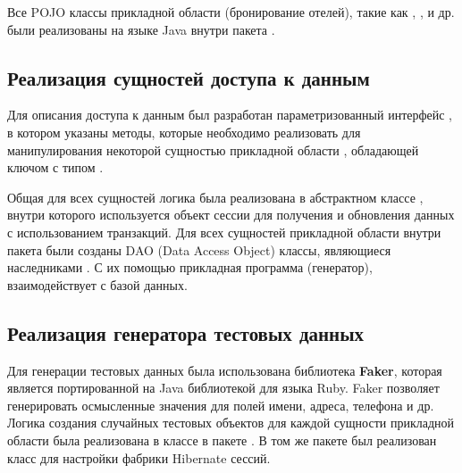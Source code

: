 Все POJO классы прикладной области (бронирование отелей), такие как , ,  и др. были реализованы на языке Java внутри пакета .

\subsection{Реализация сущностей доступа к данным}

Для описания доступа к данным был разработан параметризованный интерфейс , в котором указаны методы, которые необходимо реализовать для манипулирования некоторой сущностью прикладной области , обладающей ключом с типом .



Общая для всех сущностей логика была реализована в абстрактном классе , внутри которого используется объект сессии для получения и обновления данных с использованием транзакций. Для всех сущностей прикладной области внутри пакета  были созданы DAO (Data Access Object) классы, являющиеся наследниками . С их помощью прикладная программа (генератор), взаимодействует с базой данных.

\subsection{Реализация генератора тестовых данных}

Для генерации тестовых данных была использована библиотека \textbf{Faker}, которая является портированной на Java библиотекой для языка Ruby. Faker позволяет генерировать осмысленные значения для полей имени, адреса, телефона и др. Логика создания случайных тестовых объектов для каждой сущности прикладной области была реализована в классе  в пакете . В том же пакете был реализован класс  для настройки фабрики Hibernate сессий. 

